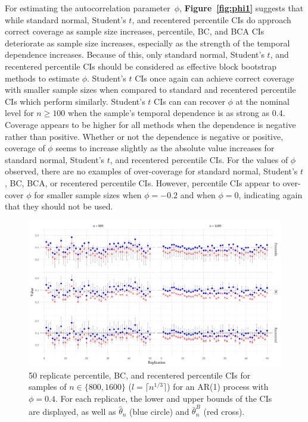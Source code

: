 \documentclass[10pt]{article}
\begin{document}
For estimating the autocorrelation parameter~$\phi$, 
\textbf{Figure~\ref{fig:phi1}} suggests that while standard normal, Student's $t$, and 
recentered percentile CIs do approach correct coverage as sample size increases, 
percentile, BC, and BCA CIs deteriorate as sample size increases, especially as 
the strength of the temporal dependence increases. Because of this, only 
standard normal, Student's $t$, and recentered percentile CIs should be considered as 
effective block bootstrap methods to estimate $\phi$. Student's $t$ CIs once 
again can achieve correct coverage with smaller sample sizes when compared to 
standard and recentered percentile CIs which perform similarly. Student's $t$ 
CIs can can recover $\phi$ at the nominal level for $n \geq 100$ when the 
sample's temporal dependence is as strong as 0.4. Coverage appears to be higher 
for all methods when the dependence is negative rather than positive. Whether or 
not the dependence is negative or positive, coverage of $\phi$ seems to increase 
slightly as the absolute value increases for standard normal, Student's $t$, and 
recentered percentile CIs. For the values of $\phi$ observed, there are no 
examples of over-coverage for standard normal, Student's $t$, BC, BCA, or recentered 
percentile CIs. However, percentile CIs appear to over-cover $\phi$ for smaller 
sample sizes when $\phi = -0.2$ and when $\phi = 0$, indicating again that they 
should not be used.


\begin{figure}[tbp]
  \centering
  \includegraphics[width=\textwidth]{figures/norm_phi_intervals}
  \caption{50 replicate percentile, BC, and recentered percentile CIs for 
    samples of $n \in \{800, 1600\}$ ($l = \lceil n^{1/3} \rceil$)
    for an AR(1) process with $\phi = 0.4$. For 
    each replicate, the lower and upper bounds of the CIs are displayed, as well 
    as $\hat\theta_n$ (blue circle) and $\bar\theta_n^{B}$ (red cross).}
  \label{fig:npi}
\end{figure}
\end{document}
